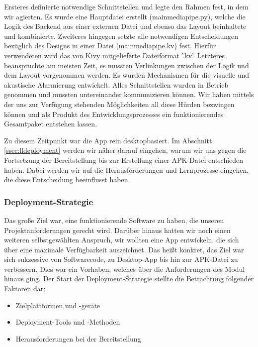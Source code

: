 		\noindent Ersteres definierte notwendige Schnittstellen und legte den Rahmen fest, in dem wir agierten. Es wurde eine Hauptdatei erstellt (mainmediapipe.py), welche die Logik des Backend aus einer externen Datei und ebenso das Layout beinhaltete und kombinierte. Zweiteres hingegen setzte alle notwendigen Entscheidungen bezüglich des Designs in einer Datei (mainmediapipe.kv) fest. Hierfür verwendeten wird das von Kivy mitgelieferte Dateiformat '.kv'. Letzteres beanspruchte am meisten Zeit, es mussten Verlinkungen zwischen der Logik und dem Layout vorgenommen werden. Es wurden Mechanismen für die visuelle und akustische Alarmierung entwickelt. Alles Schnittstellen wurden in Betrieb genommen und mussten untereinander kommunizieren können. Wir haben mittels der uns zur Verfügung stehenden Möglichkeiten all diese Hürden bezwingen können und als Produkt des Entwicklungsprozesses ein funktionierendes Gesamtpaket entstehen lassen.

		Zu diesem Zeitpunkt war die App rein desktopbasiert. Im Abschnitt \ref{ssec:lldeployment} werden wir näher darauf eingehen, warum wir uns gegen die Fortsetzung der Bereitstellung bis zur Erstellung einer APK-Datei entschieden haben. Dabei werden wir auf die Herausforderungen und Lernprozesse eingehen, die diese Entscheidung beeinflusst haben.
		
	\subsubsection{Deployment-Strategie}
	\label{sssec:deployment}
		
		Das große Ziel war, eine funktionierende Software zu haben, die unseren Projektanforderungen gerecht wird. Darüber hinaus hatten wir noch einen weiteren selbstgewählten Anspruch, wir wollten eine App entwickeln, die sich über eine maximale Verfügbarkeit auszeichnet. Das heißt konkret, das Ziel war sich sukzessive von Softwarecode, zu Desktop-App bis hin zur APK-Datei zu verbessern. Dies war ein Vorhaben, welches über die Anforderungen des Modul hinaus ging. Der Start der Deployment-Strategie stellte die Betrachtung folgender Faktoren dar:
		
		\begin{itemize}
			\item Zielplattformen und -geräte
			\item Deployment-Tools und -Methoden
			\item Herausforderungen bei der Bereitstellung
		\end{itemize}
		
